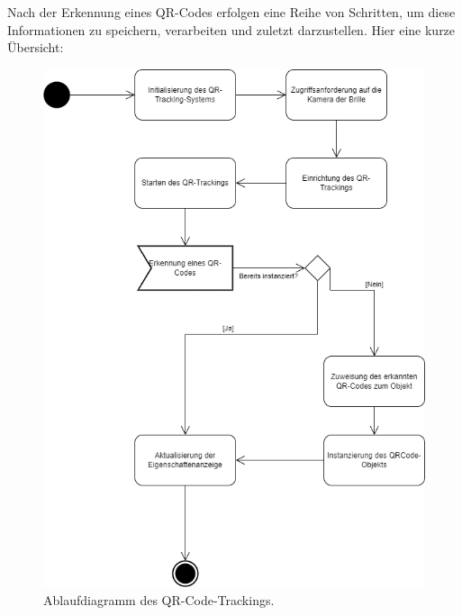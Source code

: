 Nach der Erkennung eines QR-Codes erfolgen eine Reihe von Schritten, um diese Informationen zu speichern, verarbeiten
und zuletzt darzustellen.
Hier eine kurze Übersicht:

\begin{figure}[H]
    \centering
    \includegraphics[scale=0.5, angle=0]{images/QRAblauf}
    \caption{Ablaufdiagramm des QR-Code-Trackings.}
    \label{fig:qrtracking}
\end{figure}

